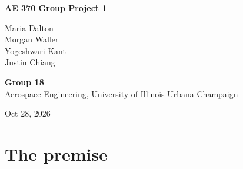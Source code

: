 \documentclass{article}
\begin{document}
\begin{titlepage}
    \centering %
    \vspace*{1cm} %
    {\Huge\textbf{AE 370 Group Project 1}\par} %
    \vspace{2cm} %
    {\Large
        Maria Dalton \\ %
        Morgan Waller \\ %
        Yogeshwari Kant \\ %
        Justin Chiang\par %
    }
    \vspace{1cm} %
    {\large
        \textbf{Group 18} \\
        Aerospace Engineering, University of Illinois Urbana-Champaign
    }
    \vfill %
    {\large Oct 28, 2026 \par} %

\end{titlepage}

\section{The premise}
\end{document}
